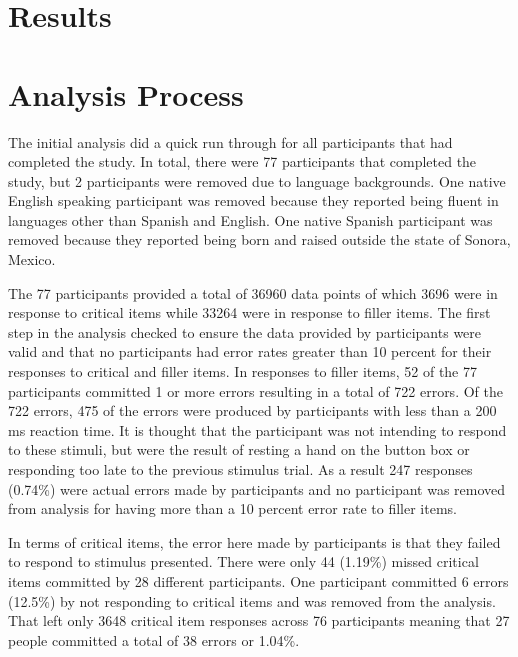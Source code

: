 
\section{Results}
\section{Analysis Process}
The initial analysis did a quick run through for all participants that had completed the study. In total, there were 77 participants that completed the study, but 2 participants were removed due to language backgrounds. One native English speaking participant %
was removed because they reported being fluent in languages other than Spanish and English. One native Spanish participant %
was removed because they reported being born and raised outside the state of Sonora, Mexico. 

The 77 participants provided a total of 36960 data points of which 3696 were in response to critical items while 33264 were in response to filler items. The first step in the analysis checked to ensure the data provided by participants were valid and that no participants had error rates greater than 10 percent for their responses to critical and filler items. In responses to filler items, 52 of the 77 participants committed 1 or more errors resulting in a total of 722 errors. Of the 722 errors, 475 of the errors were produced by participants with less than a 200 ms reaction time. It is thought that the participant was not intending to respond to these stimuli, but were the result of resting a hand on the button box or responding too late to the previous stimulus trial. As a result 247 responses (0.74\%) were actual errors made by participants and no participant was removed from analysis for having more than a 10 percent error rate to filler items. %

In terms of critical items, the error here made by participants is that they failed to respond to stimulus presented. There were only 44 (1.19\%) missed critical items committed by 28 different participants. One participant %
committed 6 errors (12.5\%) by not responding to critical items and was removed from the analysis. That left only 3648 critical item responses across 76 participants meaning that 27 people committed a total of 38 errors or 1.04\%.

